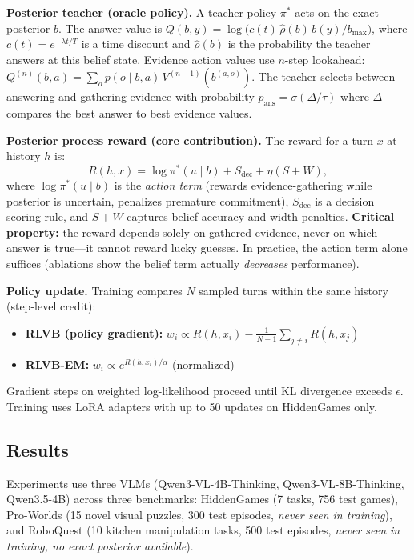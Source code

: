 \documentclass[11pt,a4paper]{article}
\begin{document}
\textbf{Posterior teacher (oracle policy).} A teacher policy $\pi^*$ acts on the exact posterior $b$. The answer value is $Q(b, y) = \log\bigl(c(t)\,\hat{\rho}(b)\,b(y) / b_{\max}\bigr)$, where $c(t) = e^{-\lambda t/T}$ is a time discount and $\hat{\rho}(b)$ is the probability the teacher answers at this belief state. Evidence action values use $n$-step lookahead: $Q^{(n)}(b,a) = \sum_o p(o \mid b,a)\, V^{(n-1)}(b^{(a,o)})$. The teacher selects between answering and gathering evidence with probability $p_{\text{ans}} = \sigma(\Delta/\tau)$ where $\Delta$ compares the best answer to best evidence values.

\textbf{Posterior process reward (core contribution).} The reward for a turn $x$ at history $h$ is:
\[
  R(h, x) = \log \pi^*(u \mid b) + S_{\text{dec}} + \eta(S + W),
\]
where $\log\pi^*(u \mid b)$ is the \emph{action term} (rewards evidence-gathering while posterior is uncertain, penalizes premature commitment), $S_{\text{dec}}$ is a decision scoring rule, and $S + W$ captures belief accuracy and width penalties. \textbf{Critical property:} the reward depends solely on gathered evidence, never on which answer is true---it cannot reward lucky guesses. In practice, the action term alone suffices (ablations show the belief term actually \emph{decreases} performance).

\textbf{Policy update.} Training compares $N$ sampled turns within the same history (step-level credit):
\begin{itemize}
  \item \textbf{RLVB (policy gradient):} $w_i \propto R(h, x_i) - \frac{1}{N-1}\sum_{j \neq i} R(h, x_j)$
  \item \textbf{RLVB-EM:} $w_i \propto e^{R(h, x_i)/\alpha}$ (normalized)
\end{itemize}
Gradient steps on weighted log-likelihood proceed until KL divergence exceeds $\epsilon$. Training uses LoRA adapters with up to 50 updates on HiddenGames only.

\subsection{Results}
Experiments use three VLMs (Qwen3-VL-4B-Thinking, Qwen3-VL-8B-Thinking, Qwen3.5-4B) across three benchmarks: HiddenGames (7 tasks, 756 test games), Pro-Worlds (15 novel visual puzzles, 300 test episodes, \emph{never seen in training}), and RoboQuest (10 kitchen manipulation tasks, 500 test episodes, \emph{never seen in training, no exact posterior available}).
\end{document}
